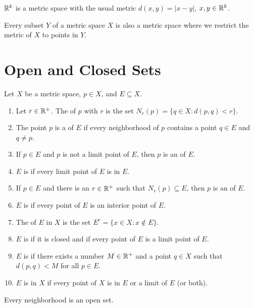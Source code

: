 \documentclass{mathnotes}
\begin{document}
\begin{note}
  $\mathbb{R}^k$ is a metric space with the usual metric $d(x,y)=|x-y|$,
  $x,y\in\mathbb{R}^k$.
\end{note}

\begin{prop}
  Every subset $Y$ of a metric space $X$ is also a metric space where we
  restrict the metric of $X$ to points in $Y$.
\end{prop}

\section*{Open and Closed Sets}

\begin{defi}
  Let $X$ be a metric space, $p\in X$, and $E\subseteq X$.
  \begin{enumerate}
    \item Let $r\in\mathbb{R}^+$. The  of $p$ with
       $r$ is the set $N_r(p)=\{q\in X:d(p,q)<r\}$.
    \item The point $p$ is a  of $E$ if every neighborhood
      of $p$ contains a point $q\in E$ and $q\ne p$.
    \item If $p\in E$ and $p$ is not a limit point of $E$, then $p$ is an
       of $E$.
    \item $E$ is  if every limit point of $E$ is in $E$.
    \item If $p\in E$ and there is an $r\in\mathbb{R}^+$ such that $N_r(p)\subseteq
      E$, then $p$ is an  of $E$.
    \item $E$ is  if every point of $E$ is an interior point of
      $E$.
    \item The  of $E$ in $X$ is the set $E^c=\{x\in
      X:x\notin E\}$.
    \item $E$ is  if it is closed and if every point of $E$ is
      a limit point of $E$.
    \item $E$ is  if there exists a number $M\in\mathbb{R}^+$ and a
      point $q\in X$ such that $d(p,q)<M$ for all $p\in E$.
    \item $E$ is  in $X$ if every point of $X$ is in $E$ or a
      limit of $E$ (or both).
  \end{enumerate}
\end{defi}

\begin{prop}
  Every neighborhood is an open set.
\end{prop}
\end{document}
